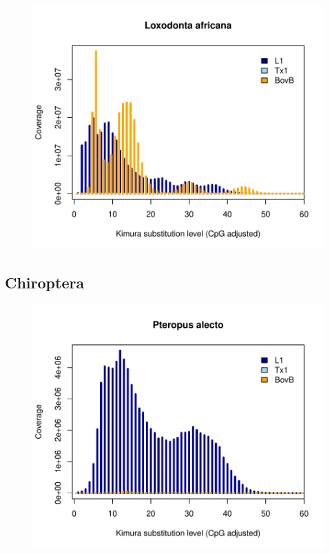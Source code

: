 \documentclass[12pt,a4paper,times]{article}
\begin{document}
\begin{figure}[H]
	\centering
	\includegraphics[scale=0.8]{suppFigures/divergencePlots/Loxodonta_africana.pdf}
	\caption{\label{Loxodonta}}
\end{figure}

\subsection*{Chiroptera}

\begin{figure}[H]
	\centering
	\includegraphics[scale=0.8]{suppFigures/divergencePlots/Pteropus_alecto.pdf}
	\caption{\label{Pteropus_alecto}}
\end{figure}
\end{document}
